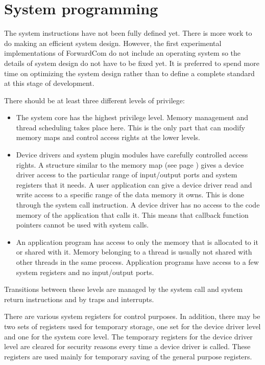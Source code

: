 \documentclass[forwardcom.tex]{subfiles}
\begin{document}
\RaggedRight

\chapter{System programming} \label{SystemProgramming}

The system instructions have not been fully defined yet. There is more work to do making an efficient system design. However, the first experimental implementations of ForwardCom do not include an operating system so the details of system design do not have to be fixed yet. It is preferred to spend more time on optimizing the system design rather than to define a complete standard at this stage of development.
\vv

There should be at least three different levels of privilege:
\begin{itemize}
\item The system core has the highest privilege level. Memory management and thread scheduling takes place here. This is the only part that can modify memory maps and control access rights at the lower levels.

\item Device drivers and system plugin modules have carefully controlled access rights. A structure similar to the memory map (see page \pageref{memoryManagement}) gives a device driver access to the particular range of input/output ports and system registers that it needs. A user application can give a device driver read and write access to a specific range of the data memory it owns. This is done through the system call instruction. A device driver has no access to the code memory of the application that calls it. This means that callback function pointers cannot be used with system calls.

\item An application program has access to only the memory that is allocated to it or shared with it. Memory belonging to a thread is usually not shared with other threads in the same process. Application programs have access to a few system registers and no input/output ports.

\end{itemize}

Transitions between these levels are managed by the system call and system return instructions and by traps and interrupts.
\vv

There are various system registers for control purposes. In addition, there may be two sets of registers used for temporary storage, one set for the device driver level and one for the system core level. The temporary registers for the device driver level are cleared for security reasons every time a device driver is called. These registers are used mainly for temporary saving of the general purpose registers.
\end{document}
